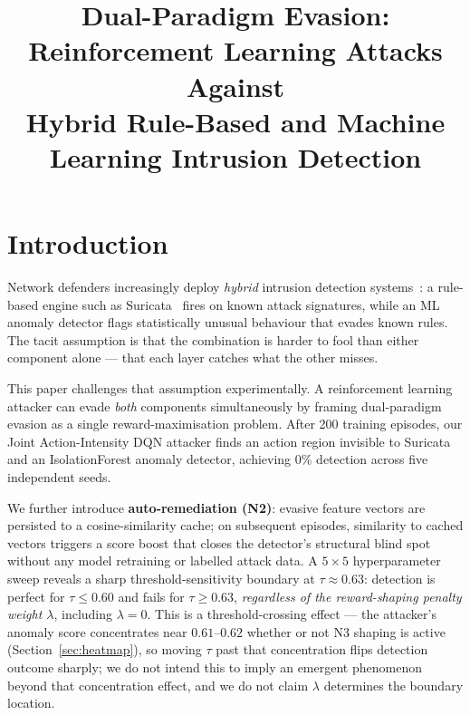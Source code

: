 \documentclass[sigconf]{acmart}
\title{Dual-Paradigm Evasion: Reinforcement Learning Attacks Against\\
       Hybrid Rule-Based and Machine Learning Intrusion Detection}
\author{}
\affiliation{\institution{}\country{}}
\begin{document}
\maketitle

\section{Introduction}
\label{sec:intro}

Network defenders increasingly deploy \emph{hybrid} intrusion detection
systems~\cite{patcha2007overview}: a rule-based engine such as
Suricata~\cite{oisf2010suricata} fires on known attack signatures, while
an ML anomaly detector flags statistically unusual behaviour that evades
known rules. The tacit assumption is that the combination is harder to
fool than either component alone --- that each layer catches what the other
misses.

This paper challenges that assumption experimentally. A reinforcement
learning attacker can evade \emph{both} components simultaneously by
framing dual-paradigm evasion as a single reward-maximisation problem.
After 200 training episodes, our Joint Action-Intensity DQN attacker finds an
action region invisible to Suricata and an Iso\-la\-tion\-Forest
anomaly detector, achieving 0\% detection across five independent seeds.

We further introduce \textbf{auto-remediation (N2)}: evasive feature
vectors are persisted to a cosine-similarity cache; on subsequent
episodes, similarity to cached vectors triggers a score boost that closes
the detector's structural blind spot without any model retraining or
labelled attack data. A $5\!\times\!5$ hyperparameter sweep reveals a
sharp threshold-sensitivity boundary at $\tau \approx 0.63$: detection
is perfect for $\tau \leq 0.60$ and fails for $\tau \geq 0.63$,
\emph{regardless of the reward-shaping penalty weight $\lambda$},
including $\lambda=0$. This is a threshold-crossing effect --- the
attacker's anomaly score concentrates near $0.61$--$0.62$ whether or
not N3 shaping is active (Section~\ref{sec:heatmap}), so moving $\tau$
past that concentration flips detection outcome sharply; we do not
intend this to imply an emergent phenomenon beyond that concentration
effect, and we do not claim $\lambda$ determines the boundary location.
\end{document}
